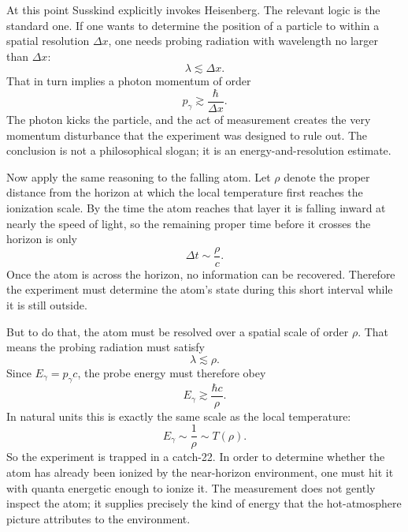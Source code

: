 At this point Susskind explicitly invokes Heisenberg. The relevant logic is the standard one. If one wants to determine the position of a particle to within a spatial resolution \(\Delta x\), one needs probing radiation with wavelength no larger than \(\Delta x\):
\begin{equation}
\lambda \lesssim \Delta x.
\end{equation}
That in turn implies a photon momentum of order
\begin{equation}
p_\gamma \gtrsim \frac{\hbar}{\Delta x}.
\end{equation}
The photon kicks the particle, and the act of measurement creates the very momentum disturbance that the experiment was designed to rule out. The conclusion is not a philosophical slogan; it is an energy-and-resolution estimate.

Now apply the same reasoning to the falling atom. Let \(\rho\) denote the proper distance from the horizon at which the local temperature first reaches the ionization scale. By the time the atom reaches that layer it is falling inward at nearly the speed of light, so the remaining proper time before it crosses the horizon is only
\begin{equation}
\Delta t \sim \frac{\rho}{c}.
\end{equation}
Once the atom is across the horizon, no information can be recovered. Therefore the experiment must determine the atom's state during this short interval while it is still outside.

But to do that, the atom must be resolved over a spatial scale of order \(\rho\). That means the probing radiation must satisfy
\begin{equation}
\lambda \lesssim \rho.
\end{equation}
Since \(E_\gamma=p_\gamma c\), the probe energy must therefore obey
\begin{equation}
E_\gamma \gtrsim \frac{\hbar c}{\rho}.
\end{equation}
In natural units this is exactly the same scale as the local temperature:
\begin{equation}
E_\gamma \sim \frac{1}{\rho}\sim T(\rho).
\end{equation}
So the experiment is trapped in a catch-22. In order to determine whether the atom has already been ionized by the near-horizon environment, one must hit it with quanta energetic enough to ionize it. The measurement does not gently inspect the atom; it supplies precisely the kind of energy that the hot-atmosphere picture attributes to the environment.

